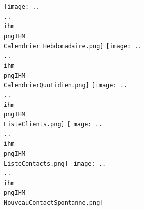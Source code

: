 \texttt{[image: ..\\..\\ihm\\pngIHM\\Calendrier Hebdomadaire.png]}
\texttt{[image: ..\\..\\ihm\\pngIHM\\CalendrierQuotidien.png]}
\texttt{[image: ..\\..\\ihm\\pngIHM\\ListeClients.png]}
\texttt{[image: ..\\..\\ihm\\pngIHM\\ListeContacts.png]}
\texttt{[image: ..\\..\\ihm\\pngIHM\\NouveauContactSpontanne.png]}


